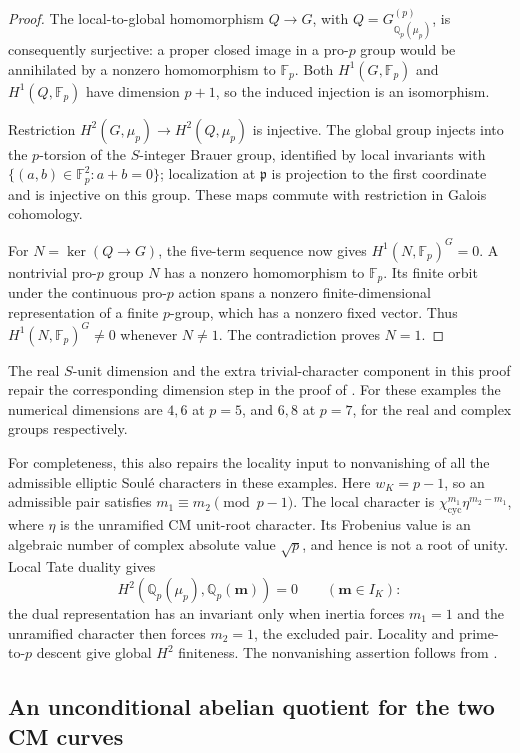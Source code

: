 \documentclass[11pt]{article}
\theoremstyle{definition}\newtheorem{definition}[theorem]{Definition}
\begin{document}
\begin{proof}
The local-to-global homomorphism \(Q\to G\), with
\(Q=G_{\mathbb Q_p(\mu_p)}^{(p)}\), is consequently
surjective: a proper closed image in a pro-\(p\) group
would be annihilated by a nonzero homomorphism to
\(\mathbb F_p\). Both \(H^1(G,\mathbb F_p)\) and
\(H^1(Q,\mathbb F_p)\) have dimension \(p+1\), so the
induced injection is an isomorphism.

Restriction \(H^2(G,\mu_p)\to H^2(Q,\mu_p)\) is
injective. The global group injects into the
\(p\)-torsion of the \(S\)-integer Brauer group, identified
by local invariants with
\(\{(a,b)\in\mathbb F_p^2:a+b=0\}\); localization at
\(\mathfrak p\) is projection to the first coordinate
and is injective on this group. These maps commute
with restriction in Galois cohomology.

For \(N=\ker(Q\to G)\), the five-term sequence now
gives \(H^1(N,\mathbb F_p)^G=0\).
A nontrivial pro-\(p\) group \(N\) has a nonzero
homomorphism to \(\mathbb F_p\). Its finite orbit
under the continuous pro-\(p\) action spans a nonzero
finite-dimensional representation of a finite
\(p\)-group, which has a nonzero fixed vector.
Thus \(H^1(N,\mathbb F_p)^G\ne0\) whenever \(N\ne1\).
The contradiction proves \(N=1\).
\end{proof}

The real \(S\)-unit dimension and the extra trivial-character
component in this proof repair the corresponding dimension
step in the proof of \cite[Theorem A.1, pp.~28--29]{Ishii}.
For these examples the numerical dimensions are \(4,6\) at
\(p=5\), and \(6,8\) at \(p=7\), for the real and complex
groups respectively.

For completeness, this also repairs the locality input to
nonvanishing of all the admissible elliptic Soul\'e characters
in these examples. Here \(w_K=p-1\), so an admissible pair
satisfies \(m_1\equiv m_2\pmod{p-1}\). The local character is
\(\chi_{\mathrm{cyc}}^{m_1}\eta^{m_2-m_1}\), where \(\eta\)
is the unramified CM unit-root character. Its Frobenius
value is an algebraic number of complex absolute value
\(\sqrt p\), and hence is not a root of unity.
Local Tate duality gives
\[
 H^2(\mathbb Q_p(\mu_p),\mathbb Q_p(\boldsymbol m))=0
 \qquad(\boldsymbol m\in I_K):
\]
the dual representation has an invariant only when inertia
forces \(m_1=1\) and the unramified character then forces
\(m_2=1\), the excluded pair. Locality and prime-to-\(p\)
descent give global \(H^2\) finiteness. The nonvanishing
assertion follows from \cite[Theorem 2.8(2), p.~9]{Ishii}.

\subsection{An unconditional abelian quotient for the two CM curves}
\end{document}
